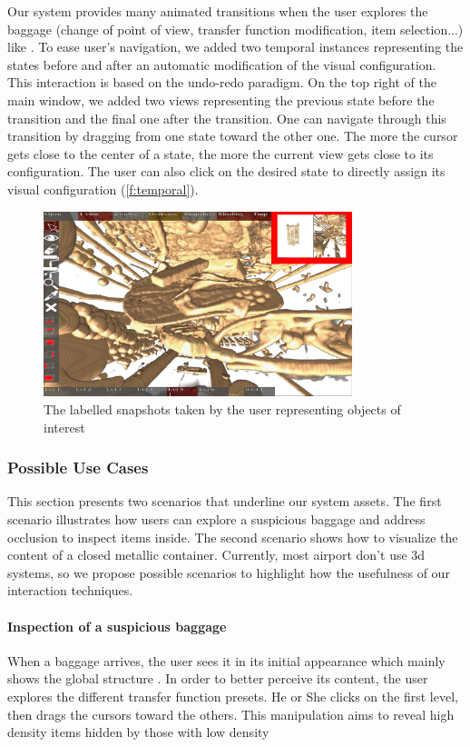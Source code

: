 Our system provides many animated transitions when the user explores the baggage (change of point of view, transfer function modification, item selection...) like \cite{tversky_animation:_2002}. To ease user's navigation, we added two temporal instances representing the states before and after an automatic modification of the visual configuration. This interaction is based on the undo-redo paradigm. On the top right of the main window, we added two views representing the previous state before the transition and the final one after the transition. One can navigate through this transition by dragging from one state toward the other one. The more the cursor gets close to the center of a state, the more the current view gets close to its configuration. The user can also click on the desired state to directly assign its visual configuration (\autoref{f:temporal}).
 \begin{figure}
 \centering
	\includegraphics[width=9cm]{Figures/temporal.png}
	\caption{ The labelled snapshots taken by the user representing objects of interest}
	\label{f:temporal}
\end{figure}

\subsubsection{Possible Use Cases}

This section presents two scenarios that underline our system assets. The first scenario illustrates how users can explore a suspicious baggage and address occlusion to inspect items inside. The second scenario shows how to visualize the content of a closed metallic container. Currently, most airport don't use 3d systems, so we propose possible scenarios to highlight  how the usefulness of our interaction techniques.

\paragraph{	Inspection of a suspicious baggage }
When a baggage arrives, the user sees it in its initial appearance which mainly shows the global structure . In order to better perceive its content, the user explores  the different transfer function presets. He or She clicks on the first level, then drags the cursors toward the others. This manipulation aims to reveal high density items hidden by those with low density 


